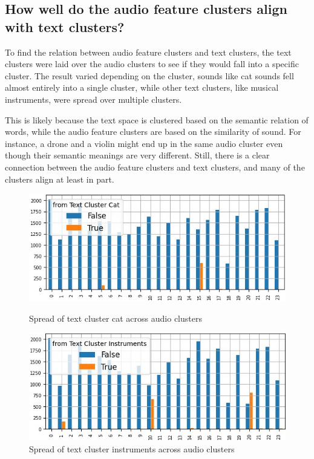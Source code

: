 \subsection{How well do the audio feature clusters align with text clusters?}
\label{sec:Text Features:c}


To find the relation between audio feature clusters and text clusters, the text clusters were laid over the audio clusters to see if they would fall into a specific cluster. The result varied depending on the cluster, sounds like cat sounds fell almost entirely into a single cluster, while other text clusters, like musical instruments, were spread over multiple clusters.

This is likely because the text space is clustered based on the semantic relation of words, while the audio feature clusters are based on the similarity of sound. For instance, a drone and a violin might end up in the same audio cluster even though their semantic meanings are very different. 
Still, there is a clear connection between the audio feature clusters and text clusters, and many of the clusters align at least in part.

\begin{figure}[h]
  \centering
  \begin{minipage}[b]{0.49\textwidth}
    \centering
    \includegraphics[width=\textwidth]{figs/cat_test_cluster_over_audio_cluster.jpg}
    \caption{Spread of text cluster cat across audio clusters}
    \label{fig:image1}
  \end{minipage}
  \hfill
  \begin{minipage}[b]{0.49\textwidth}
    \centering
    \includegraphics[width=\textwidth]{figs/instruments_test_cluster_over_audio_cluster.jpg}
    \caption{Spread of text cluster instruments across audio clusters}
    \label{fig:image2}
  \end{minipage}
\end{figure}



